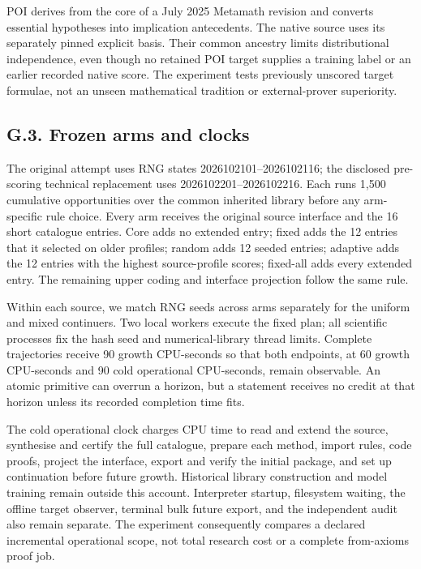 \documentclass[pdflatex,sn-basic,Numbered]{sn-jnl}
\begin{document}
POI derives from the core of a July 2025 Metamath revision and converts essential hypotheses into implication antecedents. The native source uses its separately pinned explicit basis. Their common ancestry limits distributional independence, even though no retained POI target supplies a training label or an earlier recorded native score. The experiment tests previously unscored target formulae, not an unseen mathematical tradition or external-prover superiority.

\subsection*{G.3. Frozen arms and clocks}\label{g.3.-frozen-arms-and-clocks}

The original attempt uses RNG states 2026102101--2026102116; the disclosed pre-scoring technical replacement uses 2026102201--2026102216. Each runs 1,500 cumulative opportunities over the common inherited library before any arm-specific rule choice. Every arm receives the original source interface and the 16 short catalogue entries. Core adds no extended entry; fixed adds the 12 entries that it selected on older profiles; random adds 12 seeded entries; adaptive adds the 12 entries with the highest source-profile scores; fixed-all adds every extended entry. The remaining upper coding and interface projection follow the same rule.

Within each source, we match RNG seeds across arms separately for the uniform and mixed continuers. Two local workers execute the fixed plan; all scientific processes fix the hash seed and numerical-library thread limits. Complete trajectories receive 90 growth CPU-seconds so that both endpoints, at 60 growth CPU-seconds and 90 cold operational CPU-seconds, remain observable. An atomic primitive can overrun a horizon, but a statement receives no credit at that horizon unless its recorded completion time fits.

The cold operational clock charges CPU time to read and extend the source, synthesise and certify the full catalogue, prepare each method, import rules, code proofs, project the interface, export and verify the initial package, and set up continuation before future growth. Historical library construction and model training remain outside this account. Interpreter startup, filesystem waiting, the offline target observer, terminal bulk future export, and the independent audit also remain separate. The experiment consequently compares a declared incremental operational scope, not total research cost or a complete from-axioms proof job.
\end{document}

